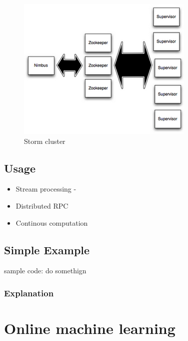 \documentclass[journal]{IEEEtran/IEEEtran}
\begin{document}
\begin{figure}[htbp]
    \begin{center}
        \includegraphics[scale=0.45]{img/storm-cluster.png}
        \caption{Storm cluster}
        \label{stormcluster}
    \end{center}
\end{figure}


\subsection{Usage}

\begin{itemize}
    \item Stream processing - 
    \item Distributed RPC
    \item Continous computation
\end{itemize}

\subsection{Simple Example}

\begin{code}
     
    sample code:
        do somethign
   
 


\end{code}
\subsubsection*{Explanation}

\section{Online machine learning}
\end{document}
